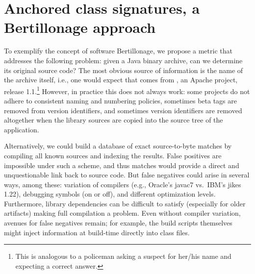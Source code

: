 \section{Anchored class signatures, a Bertillonage approach}


To exemplify the concept of software Bertillonage, we propose a metric that
addresses the following problem: given a Java binary archive, can we
determine its original source code?
The most obvious source of information is the name of the archive itself,
i.e., one would expect that  comes from
, an Apache project, release 1.1.\footnote{This is
analogous to a policeman asking a suspect for her/his name and expecting a
correct answer.}  However, in practice this does not always work:  some
projects do not adhere to consistent naming and numbering policies,
sometimes beta tags are removed from version identifiers, and sometimes
version identifiers are removed altogether when the library sources are
copied into the source tree of the application.



Alternatively, we could build a database of exact source-to-byte matches by
compiling all known sources and indexing the results.  False positives are
impossible under such a scheme, and thus matches would provide a direct and
unquestionable link back to source code. But false negatives could arise in
several ways, among these: variation of compilers (e.g., Oracle's javac7
vs.\ IBM's jikes 1.22), debugging symbols (on or off), and different
optimization levels.  Furthermore, library dependencies can be difficult to
satisfy (especially for older artifacts) making full compilation a problem.
Even without compiler variation, avenues for false negatives remain; for
example, the build scripts themselves might inject information at
build-time directly into class files.

